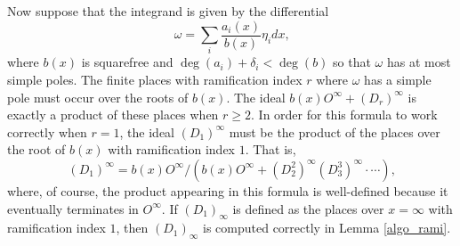 \documentclass[12pt,reqno]{amsart}
\numberwithin{equation}{section}
\begin{document}
Now suppose that the integrand is given by the differential
\begin{equation*}
 \omega = \sum_i \frac{a_i(x)}{b(x)} \eta_i dx \text{,}
\end{equation*}
where $b(x)$ is squarefree and $\deg(a_i)+\delta_i < \deg(b)$ so that $\omega$ has at most simple poles. The finite places with ramification index $r$ where $\omega$ has a simple pole must occur over the roots of $b(x)$. The ideal $b(x) O^{\infty} + (D_r)^{\infty}$ is exactly a product of these places when $r \ge 2$. In order for this formula to work correctly when $r=1$, the ideal $(D_1)^{\infty}$ must be the product of the places over the root of $b(x)$ with ramification index $1$. That is,
\begin{equation*}
(D_1)^{\infty} = b(x) O^{\infty} / (b(x) O^{\infty} + (D_2^2)^{\infty}(D_3^3)^{\infty}\cdot \cdots)\text{,}
\end{equation*}
where, of course, the product appearing in this formula is well-defined because it eventually terminates in $O^{\infty}$. If $(D_1)_{\infty}$ is defined as the places over $x=\infty$ with ramification index $1$, then $(D_1)_{\infty}$ is computed correctly in Lemma \ref{algo_rami}.
\end{document}
